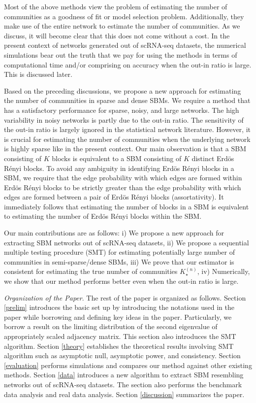 \documentclass[11pt]{article}
\begin{document}
Most of the above methods view the problem of estimating the number of communities as a goodness of fit or model selection problem. Additionally, they make use of the entire network to estimate the number of communities. As we discuss, it will become clear that this does not come without a cost. In the present context of networks generated out of scRNA-seq datasets, the numerical simulations bear out the truth that we pay for using the methods in terms of computational time and/or comprising on accuracy when the out-in ratio is large. This is discussed later. 

Based on the preceding discussions, we propose a new approach for estimating the number of communities in sparse and dense SBMs. We require a method that has a satisfactory performance for sparse, noisy, and large networks. The high variability in noisy networks is partly due to the out-in ratio. The sensitivity of the out-in ratio is largely ignored in the statistical network literature. However, it is crucial for estimating the number of communities when the underlying network is highly sparse like in the present context. Our main observation is that a SBM consisting of $K$ blocks is equivalent to a  SBM consisting of $K$ distinct Erd\"{o}s R\'{e}nyi blocks. To avoid any ambiguity in identifying Erd\"{o}s R\'{e}nyi blocks in a SBM, we require that the edge probability with which edges are formed within Erd\"{o}s R\'{e}nyi blocks to be strictly greater than the edge probability with which edges are formed between a pair of Erd\"{o}s R\'{e}nyi blocks (assortativity). It immediately follows that estimating the number of blocks in a SBM is equivalent to estimating the number of Erd\"{o}s R\'{e}nyi blocks within the SBM.

Our main contributions are as follows: i) We propose a new approach for extracting SBM networks out of scRNA-seq datasets, ii) We propose a sequential multiple testing procedure (SMT) for estimating potentially large number of communities in semi-sparse/dense SBMs, iii) We prove that our estimator is consistent for estimating the true number of communities $K_{\star}^{(n)}$, iv) Numerically, we show that our method performs better even when the out-in ratio is large. 

\emph{Organization of the Paper}. The rest of the paper is organized as follows. Section \ref{prelim} introduces the basic set up by introducing the notations used in the paper while borrowing and defining key ideas in the paper. Particularly, we borrow a result on the limiting distribution of the second eigenvalue of appropriately scaled adjacency matrix. This section also introduces the SMT algorithm. Section \ref{theory} establishes the theoretical results involving SMT algorithm such as asymptotic null, asymptotic power, and consistency. Section \ref{evaluation} performs simulations and compares our method against other existing methods. Section \ref{data} introduces a new algorithm to extract SBM resembling networks out of scRNA-seq datasets. The section also performs the benchmark data analysis and real data analysis. Section \ref{discussion} summarizes the paper.
\end{document}
